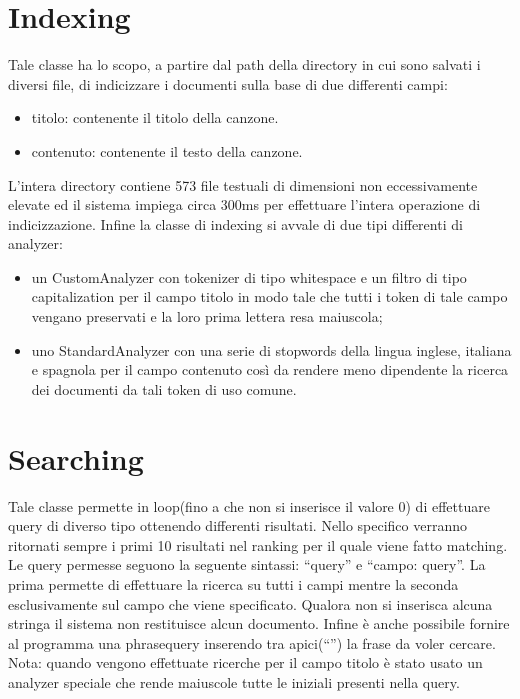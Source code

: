 \documentclass[12pt, letterpaper]{article}
\begin{document}
\section{Indexing}
Tale classe ha lo scopo, a partire dal path della directory in cui sono salvati i diversi file, di indicizzare i documenti sulla base di due differenti campi: 
\begin{itemize}
    \item titolo: contenente il titolo della canzone.
    \item contenuto: contenente il testo della canzone.
\end{itemize}
L'intera directory contiene 573 file testuali di dimensioni non eccessivamente elevate ed il sistema impiega circa 300ms per effettuare l'intera operazione di indicizzazione. Infine la classe di indexing si avvale di due tipi differenti di analyzer:
\begin{itemize}
    \item un CustomAnalyzer con tokenizer di tipo whitespace e un filtro di tipo capitalization per il campo titolo in modo tale che tutti i token di tale campo vengano preservati e la loro prima lettera resa maiuscola;
    \item uno StandardAnalyzer con una serie di stopwords della lingua inglese, italiana e spagnola per il campo contenuto così da rendere meno dipendente la ricerca dei documenti da tali token di uso comune.
\end{itemize}
\section{Searching}
Tale classe permette in loop(fino a che non si inserisce il valore 0) di effettuare query di diverso tipo ottenendo differenti risultati. Nello specifico verranno ritornati sempre i primi 10 risultati nel ranking per il quale viene fatto matching. Le query permesse seguono la seguente sintassi: “query” e “campo: query”. La prima permette di effettuare la ricerca su tutti i campi mentre la seconda esclusivamente sul campo che viene specificato. Qualora non si inserisca alcuna stringa il sistema non restituisce alcun documento. Infine è anche possibile fornire al programma una phrasequery inserendo tra apici(“”) la frase da voler cercare. Nota: quando vengono effettuate ricerche per il campo titolo è stato usato un analyzer speciale che rende maiuscole tutte le iniziali presenti nella query.
\end{document}
